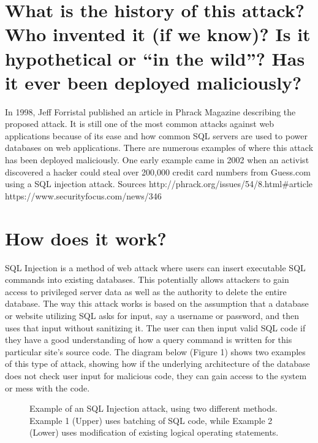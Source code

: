 \documentclass[11pt]{article}
\begin{document}
\section*{What is the history of this attack? Who invented it (if we know)? Is it hypothetical or “in the wild”? Has it ever been deployed maliciously?}
In 1998, Jeff Forristal published an article in Phrack Magazine describing the proposed attack. It is still one of the most common attacks against web applications because of its ease and how common SQL servers are used to power databases on web applications. There are numerous examples of where this attack has been deployed maliciously. One early example came in 2002 when an activist discovered a hacker could steal over 200,000 credit card numbers from Guess.com using a SQL injection attack. \newline
Sources \newline http://phrack.org/issues/54/8.html\#article \newline
https://www.securityfocus.com/news/346


\section*{How does it work?}
SQL Injection is a method of web attack where users can insert executable SQL commands into existing databases. This potentially allows attackers to gain access to privileged server data as well as the authority to delete the entire database. The way this attack works is based on the assumption that a database or website utilizing SQL asks for input, say a username or password, and then uses that input without sanitizing it. The user can then input valid SQL code if they have a good understanding of how a query command is written for this particular site's source code. The diagram below (Figure 1) shows two examples of this type of attack, showing how if the underlying architecture of the database does not check user input for malicious code, they can gain access to the system or mess with the code.\\

\begin{figure}[t]
\caption{\label{fig:my-label} Example of an SQL Injection attack, using two different methods. Example 1 (Upper) uses batching of SQL code, while Example 2 (Lower) uses modification of existing logical operating statements.}
\end{figure}
\\
\end{document}
